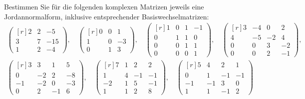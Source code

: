 \begin{question}[subtitle = Berechnung von Jordannormalformen]{1}
  Bestimmen Sie für die folgenden komplexen Matrizen jeweils eine Jordannormalform, inklusive entsprechender Basiswechselmatrizen:
  \begin{gather*}
    \begin{pmatrix*}[r]
      2 & 2 &  -5 \\
      3 & 7 & -15 \\
      1 & 2 &  -4
    \end{pmatrix*},
    \quad
    \begin{pmatrix*}[r]
      0 & 0 &  1 \\
      1 & 0 & -3 \\
      0 & 1 &  3
    \end{pmatrix*},
    \quad
    \begin{pmatrix*}[r]
      1 & 0 & 1 & -1  \\
      0 & 1 & 1 &  0  \\
      0 & 0 & 1 &  1  \\
      0 & 0 & 0 &  1
    \end{pmatrix*},
    \quad
    \begin{pmatrix*}[r]
      3 & -4  &  0  &  2  \\
      4 & -5  & -2  &  4  \\
      0 &  0  &  3  & -2  \\
      0 &  0  &  2  & -1
    \end{pmatrix*},
  \\
    \begin{pmatrix*}[r]
       3  &  3  &  1  &  5  \\
       0  & -2  &  2  & -8  \\
      -1  & -2  &  0  & -3  \\
       0  &  2  & -1  &  6
    \end{pmatrix*},
    \quad
    \begin{pmatrix*}[r]
       7  & 1 &  2  &  2  \\
       1  & 4 & -1  & -1  \\
      -2  & 1 &  5  & -1  \\
       1  & 1 &  2  &  8
    \end{pmatrix*},
    \quad
    \begin{pmatrix*}[r]
       5  &  4  &  2  &  1  \\
       0  &  1  & -1  & -1  \\
      -1  & -1  &  3  &  0  \\
       1  &  1  & -1  &  2
    \end{pmatrix*}
  \end{gather*}
\end{question}
